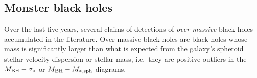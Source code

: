 %
%



\subsection{Monster black holes}
\label{sec:monsters}
Over the last five years, several claims of detections of \emph{over-massive} black holes accumulated in the literature. 
Over-massive black holes are black holes whose mass is significantly larger 
than what is expected from the galaxy's spheroid stellar velocity dispersion or stellar mass, 
i.e.~they are positive outliers in the $M_{\rm BH} - \sigma_*$ or $M_{\rm BH} - M_{\rm *,sph}$ diagrams. \\

